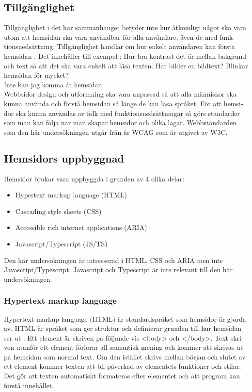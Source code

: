 \documentclass[11p]{article}
\begin{document}
\begin{otherlanguage}{swedish}
    \subsection{Tillgänglighet}
    Tillgänglighet i det här sammanhanget betyder inte hur åtkomligt något ska vara utom att hemsidan ska vara användbar för alla användare, även de med funktionsnedsättning.
    Tillgänglighet handlar om hur enkelt användaren kan första hemsidan \parencite{webbriktlinjer}.
    Det innehåller till exempel :
    Hur bra kontrast det är mellan bakgrund och text så att det ska vara enkelt att läsa texten.
    Har bilder en bildtext?
    Blinkar hemsidan för mycket?
    \\Inte kan jag komma åt hemsidan.
    \\Webbsidor design och utformning ska vara anpassad så att alla människor ska kunna använda och förstå hemsidan så länge de kan läsa språket.
    För att hemsidor ska kunna användas av folk med funktionsnedsättningar så görs standarder som man kan följa när man skapar hemsidor och olika lagar.
    Webbstandarden som den här undersökningen utgår från är WCAG som är utgivet av W3C.


    \subsection{Hemsidors uppbyggnad}
    Hemsidor brukar vara uppbyggda i grunden av 4 olika delar:
    \begin{itemize}
        \item Hypertext markup language (HTML)
        \item Cascading style sheets (CSS)
        \item Accessible rich internet applications (ARIA)
        \item Javascript/Typescript (JS/TS)
    \end{itemize}
    Den här undersökningen är intresserad i HTML, CSS och ARIA men inte Javascript/Typescript.
    Javascript och Typescript är inte relevant till den här undersökningen.

    \subsubsection{Hypertext markup language}
    Hypertext markup language (HTML) är standardspråket som hemsidor är gjorda av.
    HTML är språket som ger struktur och definierar grunden till hur hemsidan ser ut \parencite{HTML}.
    Ett element är skriven på följande vis <body> och </body>.
    Text skriven utanför ett element förlorar all semantisk mening och kommer att skrivas ut på hemsidan som normal text.
    Om den istället skrivs mellan början och slutet av ett element kommer texten att bli påverkad av elementets funktioner och stilar.
    Det gör att texten automatiskt formateras efter elementet och att program kan förstå innehållet.


\end{otherlanguage}
\end{document}
